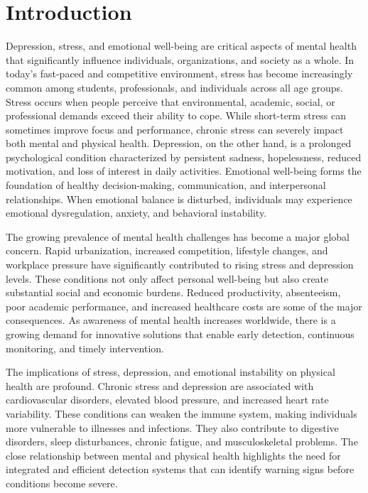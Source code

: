 
\chapter{Introduction}

Depression, stress, and emotional well-being are critical aspects of mental health that significantly influence individuals, organizations, and society as a whole. In today's fast-paced and competitive environment, stress has become increasingly common among students, professionals, and individuals across all age groups. Stress occurs when people perceive that environmental, academic, social, or professional demands exceed their ability to cope. While short-term stress can sometimes improve focus and performance, chronic stress can severely impact both mental and physical health. Depression, on the other hand, is a prolonged psychological condition characterized by persistent sadness, hopelessness, reduced motivation, and loss of interest in daily activities. Emotional well-being forms the foundation of healthy decision-making, communication, and interpersonal relationships. When emotional balance is disturbed, individuals may experience emotional dysregulation, anxiety, and behavioral instability.

The growing prevalence of mental health challenges has become a major global concern. Rapid urbanization, increased competition, lifestyle changes, and workplace pressure have significantly contributed to rising stress and depression levels. These conditions not only affect personal well-being but also create substantial social and economic burdens. Reduced productivity, absenteeism, poor academic performance, and increased healthcare costs are some of the major consequences. As awareness of mental health increases worldwide, there is a growing demand for innovative solutions that enable early detection, continuous monitoring, and timely intervention.

The implications of stress, depression, and emotional instability on physical health are profound. Chronic stress and depression are associated with cardiovascular disorders, elevated blood pressure, and increased heart rate variability. These conditions can weaken the immune system, making individuals more vulnerable to illnesses and infections. They also contribute to digestive disorders, sleep disturbances, chronic fatigue, and musculoskeletal problems. The close relationship between mental and physical health highlights the need for integrated and efficient detection systems that can identify warning signs before conditions become severe.

